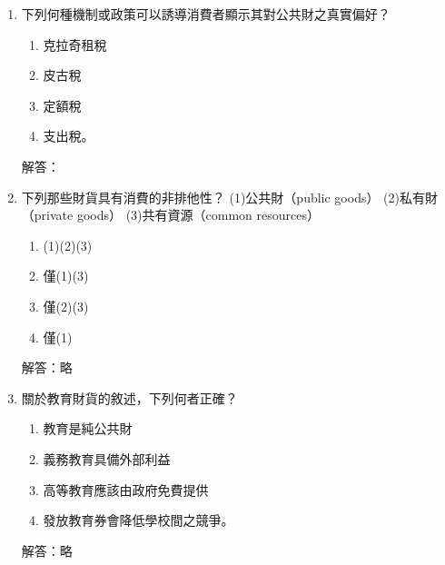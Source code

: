 \documentclass[12pt, a4paper]{article}
\begin{document}
\begin{enumerate}
    \item 下列何種機制或政策可以誘導消費者顯示其對公共財之真實偏好？
    \begin{enumerate}[label=\Alph*.]
        \item 克拉奇租稅
        \item 皮古稅
        \item 定額稅
        \item 支出稅。
    \end{enumerate}
    解答：
    \vspace{2cm}

    \item 下列那些財貨具有消費的非排他性？ (1)公共財（public goods） (2)私有財（private goods） (3)共有資源（common resources）
    \begin{enumerate}[label=\Alph*.]
        \item (1)(2)(3)
        \item 僅(1)(3)
        \item 僅(2)(3)
        \item 僅(1)
    \end{enumerate}
    解答：略

    \item 關於教育財貨的敘述，下列何者正確？
    \begin{enumerate}[label=\Alph*.]
        \item 教育是純公共財
        \item 義務教育具備外部利益
        \item 高等教育應該由政府免費提供
        \item 發放教育券會降低學校間之競爭。
    \end{enumerate}
    解答：略


\end{enumerate}
\end{document}
